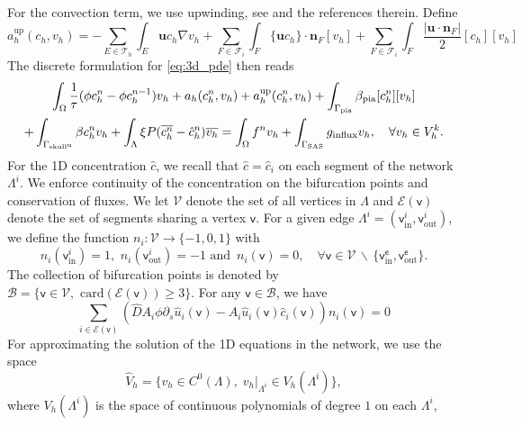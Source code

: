 For the convection term, we use upwinding, see \cite[Section 2.3.1]{di2011mathematical} and the references therein. Define 
\begin{equation*}
a_h^{\mathrm{up}}(c_h, v_h) =- \sum_{E\in\mathcal{T}_h } \int_E \bm{u} c_h \nabla v_h  + \sum_{F \in \mathcal{F}_i } \int_F \{ \bm u  c_h\} \cdot \bm{n}_F [v_h]  + \sum_{F \in \mathcal{F}_i} \int_F \frac{|\bm u \cdot \bm n_F |}{2} [c_h ] [v_h ] 
\end{equation*}
The discrete formulation for \eqref{eq:3d_pde} then reads 
\begin{multline}
\int_{\Omega}\frac{1}{\tau} (\phi c_h^n - \phi c_h^{n-1}) v_h + a_h(c_h^n, v_h) + a_h^{\mathrm{up}}(c_h^n,v_h) + \int_{\Gamma_{\mathrm{pia}} } \beta_{\mathrm{pia}}[c_h^n][v_h]  \\ + \int_{\Gamma_{\rm skull^u}} \beta c_h^n v_h +  \int_{\Lambda} \xi  P (\overline{c_h^n} - \hat c_h^n) \overline{v_h}  = \int_{\Omega} f^n v_h + \int_{\Gamma_{\rm SAS}} g_{\rm{influx}} v_h , \quad \forall v_h \in V_h^k.
\end{multline}
For the 1D concentration $\hat c$, we recall that $\hat c = \hat c_i $ on each segment of the network $\Lambda^i$.  We enforce continuity of the concentration on the bifurcation points and conservation of fluxes. We let $\mathcal{V}$ denote the set of all vertices in $\Lambda$ and $ 
\mathcal{E}(\mathsf{v})$ denote the set of segments sharing a vertex $\mathsf{v}$.  For a given edge $\Lambda^i= (\mathsf{v}_\mathrm{in}^i, \mathsf{v}_{\mathrm{out}}^{i})$, we define the function $n_i: \mathcal{V} \rightarrow \{-1,0,1\}$ with $$
n_i(\mathsf{v}_{\mathrm{in}}^i) = 1 , \,\, n _i (\mathsf{v}_{\mathrm{out}}^i) = -1 \,\, \mathrm{and} \,\,\, n_i(\mathsf{v}) = 0, \quad \forall \mathsf{v} \in 
\mathcal{V} \,  \backslash \,  \{ \mathsf{v}_{\mathrm{in}}^\mathsf e,\mathsf{v}_{\mathrm{out}}^\mathsf e \}.  
$$
The collection of bifurcation points is denoted by $\mathcal{B} = \{ \mathsf{v} \in \mathcal{V}, \,\,  \mathrm{card}(\mathcal{E}(\mathsf{v})) \geq  3\}$. For any $\mathsf{v} \in \mathcal{B}$, we have 
\begin{equation}
\sum_{ i \in \mathcal{E}(\mathsf{v})} (\hat D A_i \phi \partial_s \hat{u}_i(\mathsf{v})  -  A_i \hat u_i(\mathsf{v}) \hat c_i(\mathsf{v})) n_i(\mathsf{v}) = 0  \label{eq:flux_conservation}
\end{equation}
For approximating the solution of the 1D equations in the network, we use the space 
\[ \hat V_h = \{ v_h \in C^0(\Lambda), 
\; v_h \vert_{\Lambda^i} \in V_h(\Lambda^i)
\}, 
\]
where $V_h(\Lambda^i)$ is the space of continuous polynomials of degree $1$ on each $\Lambda^i$, 

